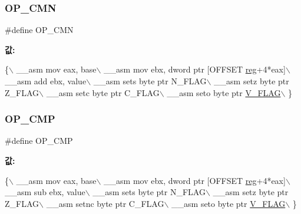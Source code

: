 \subsubsection{\texorpdfstring{O\+P\+\_\+\+C\+MN}{OP\_CMN}\hspace{0.1cm}{\footnotesize\ttfamily [2/2]}}
{\footnotesize\ttfamily \#define O\+P\+\_\+\+C\+MN}

{\bfseries 값\+:}
\begin{DoxyCode}
\{\(\backslash\)
       \_\_asm mov eax, base\(\backslash\)
       \_\_asm mov ebx, dword ptr [OFFSET \mbox{\hyperlink{_g_b_a_8h_ae29faba89509024ffd1a292badcedf2d}{reg}}+4*eax]\(\backslash\)
       \_\_asm add ebx, value\(\backslash\)
       \_\_asm sets byte ptr N\_FLAG\(\backslash\)
       \_\_asm setz byte ptr Z\_FLAG\(\backslash\)
       \_\_asm setc byte ptr C\_FLAG\(\backslash\)
       \_\_asm seto byte ptr \mbox{\hyperlink{_g_b_a_8h_a11a0e7b14a93be5eb2720b0151900919}{V\_FLAG}}\(\backslash\)
     \}
\end{DoxyCode}
\mbox{\label{_g_b_a_8cpp_a492876cb4cd38fca3ac304654e1b74b9}} 
\subsubsection{\texorpdfstring{O\+P\+\_\+\+C\+MP}{OP\_CMP}\hspace{0.1cm}{\footnotesize\ttfamily [1/2]}}
{\footnotesize\ttfamily \#define O\+P\+\_\+\+C\+MP}

{\bfseries 값\+:}
\begin{DoxyCode}
\{\(\backslash\)
       \_\_asm mov eax, base\(\backslash\)
       \_\_asm mov ebx, dword ptr [OFFSET \mbox{\hyperlink{_g_b_a_8h_ae29faba89509024ffd1a292badcedf2d}{reg}}+4*eax]\(\backslash\)
       \_\_asm sub ebx, value\(\backslash\)
       \_\_asm sets byte ptr N\_FLAG\(\backslash\)
       \_\_asm setz byte ptr Z\_FLAG\(\backslash\)
       \_\_asm setnc byte ptr C\_FLAG\(\backslash\)
       \_\_asm seto byte ptr \mbox{\hyperlink{_g_b_a_8h_a11a0e7b14a93be5eb2720b0151900919}{V\_FLAG}}\(\backslash\)
     \}
\end{DoxyCode}
\mbox{\label{arm-new_8h_a492876cb4cd38fca3ac304654e1b74b9}} 
